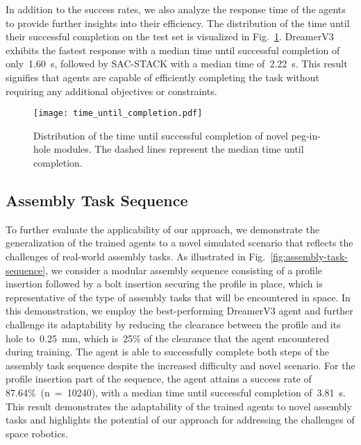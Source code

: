In addition to the success rates, we also analyze the response time of the agents to provide further insights into their efficiency. The distribution of the time until their successful completion on the test set is visualized in Fig.~\ref{fig:time-until-completion}. DreamerV3 exhibits the fastest response with a median time until successful completion of only~1.60~s, followed by SAC-STACK with a median time of~2.22~s. This result signifies that agents are capable of efficiently completing the task without requiring any additional objectives or constraints.

\begin{figure}[ht]
    \centering
    \texttt{[image: time\_until\_completion.pdf]}
    \caption{Distribution of the time until successful completion of novel peg-in-hole modules. The dashed lines represent the median time until completion.}
    \label{fig:time-until-completion}
\end{figure}


\subsection{Assembly Task Sequence}\label{ssec:assembly-task-sequence}

To further evaluate the applicability of our approach, we demonstrate the generalization of the trained agents to a novel simulated scenario that reflects the challenges of real-world assembly tasks. As illustrated in Fig.~\ref{fig:assembly-task-sequence}, we consider a modular assembly sequence consisting of a profile insertion followed by a bolt insertion securing the profile in place, which is representative of the type of assembly tasks that will be encountered in space. In this demonstration, we employ the best-performing DreamerV3 agent and further challenge its adaptability by reducing the clearance between the profile and its hole to~0.25~mm, which is~25\% of the clearance that the agent encountered during training. The agent is able to successfully complete both steps of the assembly task sequence despite the increased difficulty and novel scenario. For the profile insertion part of the sequence, the agent attains a success rate of 87.64\%~(n~=~10240), with a median time until successful completion of~3.81~s. This result demonstrates the adaptability of the trained agents to novel assembly tasks and highlights the potential of our approach for addressing the challenges of space robotics.

